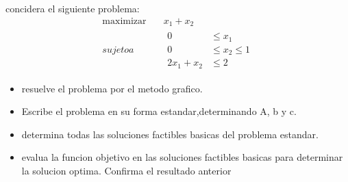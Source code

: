 \documentclass{article}
\begin{document}
concidera el siguiente problema:
\begin{equation}
\begin{aligned}
  \text{maximizar}\quad & x_1+x_2\\
  sujeto a \quad &
  \begin{aligned}
    0&\leq x_1\\
    0&\leq x_2\leq1\\
    2x_1+x_2& \leq2
    \end{aligned}
\end{aligned}
\end{equation}

\begin{itemize}

  \item resuelve el problema por el metodo grafico.
  \item Escribe el problema en su forma estandar,determinando A, b y c.
  \item determina todas las soluciones factibles basicas del problema estandar.
  \item evalua la funcion objetivo en las soluciones factibles basicas para determinar la solucion optima. Confirma el resultado anterior
 \end{itemize}
\end{document}
